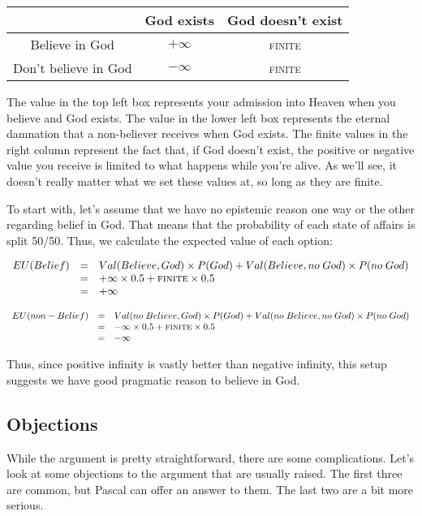 \documentclass[letterpaper,10pt]{article}
\begin{document}
\begin{center}
 \begin{tabular}{c|c|c|}
 & God exists & God doesn't exist \\ \hline
Believe in God & $+\infty$ & \textsc{finite} \\ \hline
Don't believe in God & $-\infty$ & \textsc{finite} \\ \hline
\end{tabular}
\end{center}

The value in the top left box represents your admission into Heaven when you believe and God exists.  The value in the lower left box represents the eternal damnation that a non-believer receives when God exists.  The finite values in the right column represent the fact that, if God doesn't exist, the positive or negative value you receive is limited to what happens while you're alive. As we'll see, it doesn't really matter what we set these values at, so long as they are finite.

To start with, let's assume that we have no epistemic reason one way or the other regarding belief in God.  That means that the probability of each state of affairs is split 50/50.  Thus, we calculate the expected value of each option:

\[\begin{array}{rcl}
EU(Belief) & = & Val(Believe,God)\times P(God) + Val(Believe,no \; God)\times P(no\;God) \\
 & = & +\infty\times 0.5 + \textsc{finite}\times 0.5 \\
 & = & +\infty \\   
  \end{array}\]

\[\begin{array}{rcl}
EU(non-Belief) & = & Val(no\;Believe,God)\times P(God) + Val(no\;Believe,no \; God)\times P(no\;God) \\
 & = & -\infty\times 0.5 + \textsc{finite}\times 0.5 \\
 & = & -\infty \\   
  \end{array}\]

Thus, since positive infinity is vastly better than negative infinity, this setup suggests we have good pragmatic reason to believe in God.

\subsection{Objections}
While the argument is pretty straightforward, there are some complications.  Let's look at some objections to the argument that are usually raised.  The first three are common, but Pascal can offer an answer to them.  The last two are a bit more serious.
\end{document}
